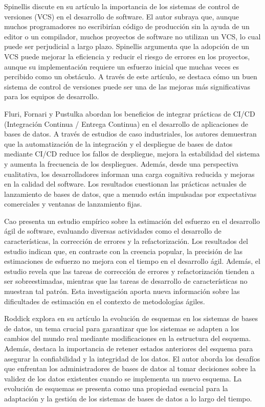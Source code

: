 \documentclass{IEEEtran}
\begin{document}
Spinellis \cite{spinellis2005version} discute en su artículo la importancia de los sistemas de control de versiones (VCS) en el desarrollo de software. El autor subraya que, aunque muchos programadores no escribirían código de producción sin la ayuda de un editor o un compilador, muchos proyectos de software no utilizan un VCS, lo cual puede ser perjudicial a largo plazo. Spinellis argumenta que la adopción de un VCS puede mejorar la eficiencia y reducir el riesgo de errores en los proyectos, aunque su implementación requiere un esfuerzo inicial que muchas veces es percibido como un obstáculo. A través de este artículo, se destaca cómo un buen sistema de control de versiones puede ser una de las mejoras más significativas para los equipos de desarrollo.


Fluri, Fornari y Pustulka \cite{fluri2023measuring} abordan los beneficios de integrar prácticas de CI/CD (Integración Continua / Entrega Continua) en el desarrollo de aplicaciones de bases de datos. A través de estudios de caso industriales, los autores demuestran que la automatización de la integración y el despliegue de bases de datos mediante CI/CD reduce los fallos de despliegue, mejora la estabilidad del sistema y aumenta la frecuencia de los despliegues. Además, desde una perspectiva cualitativa, los desarrolladores informan una carga cognitiva reducida y mejoras en la calidad del software. Los resultados cuestionan las prácticas actuales de lanzamiento de bases de datos, que a menudo están impulsadas por expectativas comerciales y ventanas de lanzamiento fijas.


Cao \cite{cao2022estimating} presenta un estudio empírico sobre la estimación del esfuerzo en el desarrollo ágil de software, evaluando diversas actividades como el desarrollo de características, la corrección de errores y la refactorización. Los resultados del estudio indican que, en contraste con la creencia popular, la precisión de las estimaciones de esfuerzo no mejora con el tiempo en el desarrollo ágil. Además, el estudio revela que las tareas de corrección de errores y refactorización tienden a ser sobreestimadas, mientras que las tareas de desarrollo de características no muestran tal patrón. Esta investigación aporta nueva información sobre las dificultades de estimación en el contexto de metodologías ágiles.


Roddick \cite{roddick1992schema} explora en su artículo la evolución de esquemas en los sistemas de bases de datos, un tema crucial para garantizar que los sistemas se adapten a los cambios del mundo real mediante modificaciones en la estructura del esquema. Además, destaca la importancia de retener estados anteriores del esquema para asegurar la confiabilidad y la integridad de los datos. El autor aborda los desafíos que enfrentan los administradores de bases de datos al tomar decisiones sobre la validez de los datos existentes cuando se implementa un nuevo esquema. La evolución de esquemas se presenta como una propiedad esencial para la adaptación y la gestión de los sistemas de bases de datos a lo largo del tiempo.
\end{document}
